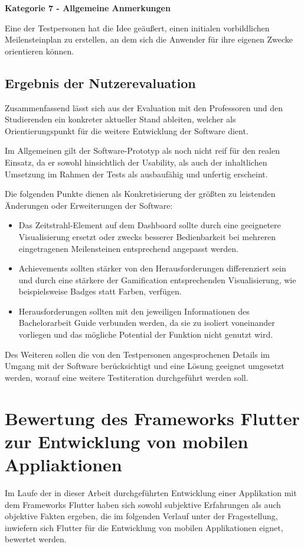 \documentclass[bibliography=totoc,listof=totoc,BCOR=5mm,DIV=12,oneside]{scrbook}
\begin{document}
\par \bigskip \textbf{Kategorie 7 - Allgemeine Anmerkungen}
\par Eine der Testpersonen hat die Idee geäußert, einen initialen vorbildlichen Meilensteinplan zu erstellen, an dem sich die Anwender für ihre eigenen Zwecke orientieren können.

\newpage
\subsection{Ergebnis der Nutzerevaluation}
\par Zusammenfassend lässt sich aus der Evaluation mit den Professoren und den Studierenden ein konkreter aktueller Stand ableiten, welcher als Orientierungspunkt für die weitere Entwicklung der Software dient.
\par \bigskip Im Allgemeinen gilt der Software-Prototyp als noch nicht reif für den realen Einsatz, da er sowohl hinsichtlich der Usability, als auch der inhaltlichen Umsetzung im Rahmen der Tests als ausbaufähig und unfertig erscheint.
\par \bigskip Die folgenden Punkte dienen als Konkretisierung der größten zu leistenden Änderungen oder Erweiterungen der Software:

\begin{itemize}
\item Das Zeitstrahl-Element auf dem Dashboard sollte durch eine geeignetere Visualisierung ersetzt oder zwecks besserer Bedienbarkeit bei mehreren eingetragenen Meilensteinen entsprechend angepasst werden.
\item Achievements sollten stärker von den Herausforderungen differenziert sein und durch eine stärkere der Gamification entsprechenden Visualisierung, wie beispielsweise Badges statt Farben, verfügen.
\item Herausforderungen sollten mit den jeweiligen Informationen des Bachelorarbeit Guide verbunden werden, da sie zu isoliert voneinander vorliegen und das mögliche Potential der Funktion nicht genutzt wird.
\end{itemize}

\par Des Weiteren sollen die von den Testpersonen angesprochenen Details im Umgang mit der Software berücksichtigt und eine Lösung geeignet umgesetzt werden, worauf eine weitere Testiteration durchgeführt werden soll.



\newpage
\section{Bewertung des Frameworks Flutter zur Entwicklung von mobilen Appliaktionen}
\par Im Laufe der in dieser Arbeit durchgeführten Entwicklung einer Applikation mit dem Frameworks Flutter haben sich sowohl subjektive Erfahrungen als auch objektive Fakten ergeben, die im folgenden Verlauf unter der Fragestellung, inwiefern sich Flutter für die Entwicklung von mobilen Applikationen eignet, bewertet werden.
\end{document}
